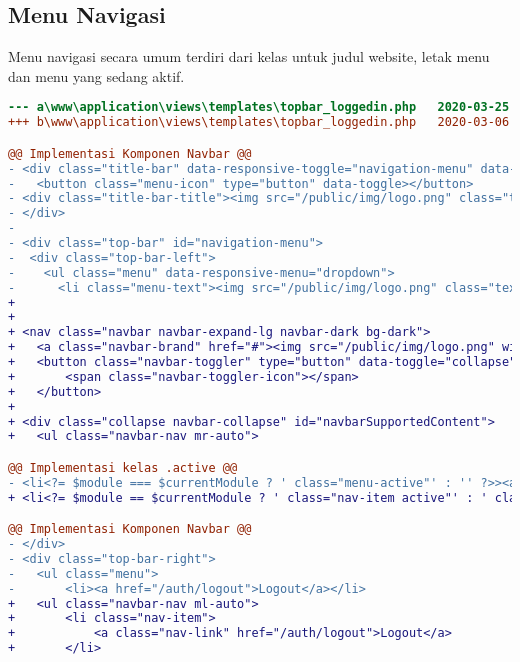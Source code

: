 \subsection{Menu Navigasi}
Menu navigasi secara umum terdiri dari kelas untuk judul website, letak menu dan menu yang sedang aktif.
\begin{lstlisting}[language=diff, caption=Perubahan file \path{\views\templates\topbar_loggedin.php} , label=Entri, basicstyle=\ttfamily, frame=single,
columns=fullflexible, keepspaces=true, breaklines=true]
--- a\www\application\views\templates\topbar_loggedin.php	2020-03-25 20:27:35.000000000 +0700
+++ b\www\application\views\templates\topbar_loggedin.php	2020-03-06 09:56:06.000000000 +0700

@@ Implementasi Komponen Navbar @@
- <div class="title-bar" data-responsive-toggle="navigation-menu" data-hide-for="medium">
- 	<button class="menu-icon" type="button" data-toggle></button>
- <div class="title-bar-title"><img src="/public/img/logo.png" class="textsized" alt="B"/></div>
- </div>
-
- <div class="top-bar" id="navigation-menu">
-  <div class="top-bar-left">
-    <ul class="menu" data-responsive-menu="dropdown">
-      <li class="menu-text"><img src="/public/img/logo.png" class="textsized" alt="B"/></li>
+ 		
+ 			
+ <nav class="navbar navbar-expand-lg navbar-dark bg-dark">
+   <a class="navbar-brand" href="#"><img src="/public/img/logo.png" width="50"/></a>
+ 	<button class="navbar-toggler" type="button" data-toggle="collapse" data-target="#navbarSupportedContent" aria-controls="navbarSupportedContent" aria-expanded="false" aria-label="Toggle navigation">
+ 		<span class="navbar-toggler-icon"></span>
+ 	</button>
+ 		
+ <div class="collapse navbar-collapse" id="navbarSupportedContent">
+ 	<ul class="navbar-nav mr-auto">

@@ Implementasi kelas .active @@
- <li<?= $module === $currentModule ? ' class="menu-active"' : '' ?>><a href="/<?= $module ?>"><?= $this->config->item('module-names')[$module] ?></a></li>
+ <li<?= $module == $currentModule ? ' class="nav-item active"' : ' class="nav-item "' ?>><a class="nav-link" href="/<?= $module ?>"><?= $this->config->item('module-names')[$module] ?></a></li>

@@ Implementasi Komponen Navbar @@
- </div>
- <div class="top-bar-right">
- 	<ul class="menu">
- 		<li><a href="/auth/logout">Logout</a></li>
+ 	<ul class="navbar-nav ml-auto">
+ 		<li class="nav-item">
+ 		    <a class="nav-link" href="/auth/logout">Logout</a>
+ 		</li>

\end{lstlisting}

